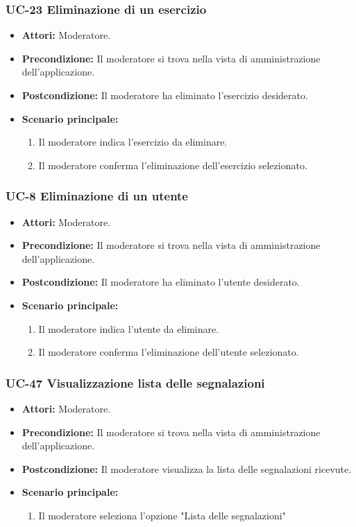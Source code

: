 \subsubsection{UC-23 Eliminazione di un esercizio}
			\begin{itemize}
			\item \textbf{Attori:} Moderatore.
			\item \textbf{Precondizione:} Il moderatore si trova nella vista di amministrazione dell'applicazione.
			\item \textbf{Postcondizione:} Il moderatore ha eliminato l'esercizio desiderato.
			\item \textbf{Scenario principale:}
				\begin{enumerate}
					\item Il moderatore indica l'esercizio da eliminare.
					\item Il moderatore conferma l'eliminazione dell'esercizio selezionato.
				\end{enumerate}
		\end{itemize}

\subsubsection{UC-8 Eliminazione di un utente}
\begin{itemize}
	\item \textbf{Attori:} Moderatore.
	\item \textbf{Precondizione:} Il moderatore si trova nella vista di amministrazione dell'applicazione.
	\item \textbf{Postcondizione:} Il moderatore ha eliminato l'utente desiderato.
	\item \textbf{Scenario principale:}
	\begin{enumerate}
		\item Il moderatore indica l'utente da eliminare.
		\item Il moderatore conferma l'eliminazione dell'utente selezionato.
	\end{enumerate}
\end{itemize}

\subsubsection{UC-47 Visualizzazione lista delle segnalazioni}
\begin{itemize}
	\item \textbf{Attori:} Moderatore.
	\item \textbf{Precondizione:} Il moderatore si trova nella vista di amministrazione dell'applicazione.
	\item \textbf{Postcondizione:} Il moderatore visualizza la lista delle segnalazioni ricevute.
	\item \textbf{Scenario principale:}
	\begin{enumerate}
		\item Il moderatore seleziona l'opzione "Lista delle segnalazioni"
	\end{enumerate}
\end{itemize}

